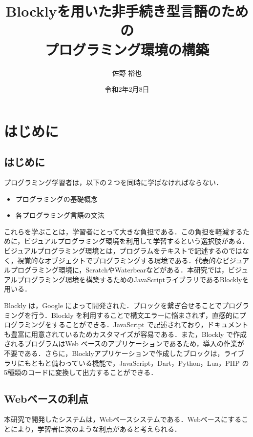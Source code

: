 \documentclass{risepaper}
\title{Blocklyを用いた非手続き型言語のための \\ プログラミング環境の構築}
\author{佐野 裕也}
\date{令和2年2月8日}
\begin{document}
 
\maketitle
                                                          
   \chapter{はじめに}
   
   \section{はじめに}


  プログラミング学習者は，以下の２つを同時に学ばなければならない．
  
\begin{itemize}
\item プログラミングの基礎概念
\item 各プログラミング言語の文法
\end{itemize} 

これらを学ぶことは，学習者にとって大きな負担である．この負担を軽減するために，ビジュアルプログラミング環境を利用して学習するという選択肢がある．ビジュアルプログラミング環境とは，プログラムをテキストで記述するのではなく，視覚的なオブジェクトでプログラミングする環境である．代表的なビジュアルプログラミング環境に，Scratch\cite{Scratch}やWaterbear\cite{waterbear}などがある．本研究では，ビジュアルプログラミング環境を構築するためのJavaScriptライブラリであるBlockly\cite{Blockly}を用いる．
  
Blockly は，Google によって開発された．ブロックを繋ぎ合せることでプログラミングを行う．Blockly を利用することで構文エラーに悩まされず，直感的にプログラミングをすることができる．JavaScript で記述されており，ドキュメントも豊富に用意されているためカスタマイズが容易である．また，Blockly で作成されるプログラムはWeb ベースのアプリケーションであるため，導入の作業が不要である．さらに，Blocklyアプリケーションで作成したブロックは，ライブラリにもともと備わっている機能で，JavaScript，Dart，Python，Lua，PHP の5種類のコードに変換して出力することができる．

   \section{Webベースの利点}
   
本研究で開発したシステムは，Webベースシステムである．Webベースにすることにより，学習者に次のような利点があると考えられる．
\end{document}
